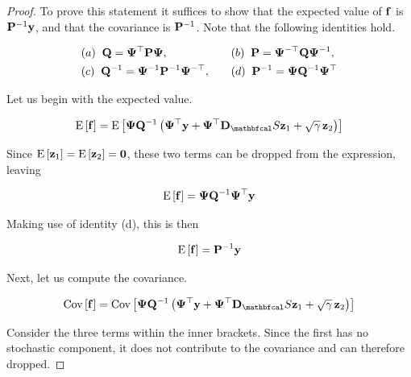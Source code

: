 \begin{proof}
    To prove this statement it suffices to show that the expected value of $\mathbf{f}$ is $\mathbf{P}^{-1}\mathbf{y}$, and that the covariance is $\mathbf{P}^{-1}$. Note that the following identities hold. 

    \begin{align*}
        &(a) \;\; \mathbf{Q} = \mathbf{\Psi}^\top \mathbf{P} \mathbf{\Psi}, \quad &&(b) \;\; \mathbf{P} = \mathbf{\Psi}^{-\top} \mathbf{Q} \mathbf{\Psi}^{-1}, \\
        &(c) \;\; \mathbf{Q}^{-1} = \mathbf{\Psi}^{-1} \mathbf{P}^{-1} \mathbf{\Psi}^{-\top}, \quad &&(d) \;\; \mathbf{P}^{-1} = \mathbf{\Psi} \mathbf{Q}^{-1} \mathbf{\Psi}^\top
    \end{align*}
    
    Let us begin with the expected value. 

    \begin{equation*}
        \text{E}\left[\f\right] = \text{E}\left[\PSI \Q^{-1} \left(\PSI^\top \y + \PSI^\top \D_\St \z_1 + \sqrt{\gamma} \, \z_2\right)\right]
    \end{equation*}

    Since $\text{E}\left[\mathbf{z}_1\right] = \text{E}\left[\mathbf{z}_2\right] = \mathbf{0}$, these two terms can be dropped from the expression, leaving 

    \begin{equation*}
        \text{E}\left[\mathbf{f}\right] = \mathbf{\Psi} \mathbf{Q}^{-1} \mathbf{\Psi}^\top \mathbf{y}
    \end{equation*}

    Making use of identity (d), this is then 

    \begin{equation*}
        \text{E}\left[\mathbf{f}\right] = \mathbf{P}^{-1} \mathbf{y}
    \end{equation*}

    Next, let us compute the covariance. 

    \begin{equation*}
        \text{Cov}\left[\f\right] = \text{Cov}\left[\PSI \Q^{-1} \left(\PSI^\top \y + \PSI^\top \D_\St \z_1 + \sqrt{\gamma} \, \z_2\right)\right] 
    \end{equation*}

    Consider the three terms within the inner brackets. Since the first has no stochastic component, it does not contribute to the covariance and can therefore dropped. 


\end{proof}
